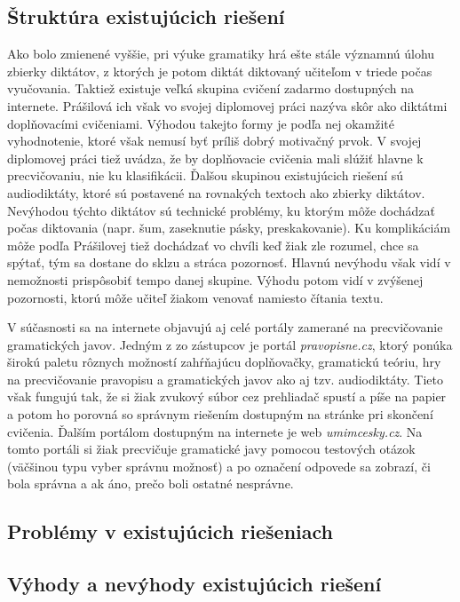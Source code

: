 \documentclass[12pt,oneside]{fithesis2}
\begin{document}
       		\subsection{Štruktúra existujúcich riešení}
       				\par Ako bolo zmienené vyššie, pri výuke gramatiky hrá ešte stále významnú úlohu zbierky diktátov, z ktorých je potom diktát diktovaný učiteľom v triede počas vyučovania. Taktiež existuje veľká skupina cvičení zadarmo dostupných na internete. Prášilová\cite{prasilova14} ich však vo svojej diplomovej práci nazýva skôr ako diktátmi doplňovacími cvičeniami. Výhodou takejto formy je podľa nej okamžité vyhodnotenie, ktoré však nemusí byť príliš dobrý motivačný prvok. V svojej diplomovej práci tiež uvádza, že by doplňovacie cvičenia mali slúžiť hlavne k precvičovaniu, nie ku klasifikácii. Ďalšou skupinou existujúcich riešení sú audiodiktáty, ktoré sú postavené na rovnakých textoch ako zbierky diktátov. Nevýhodou týchto diktátov sú technické problémy, ku ktorým môže dochádzať počas diktovania (napr. šum, zaseknutie pásky, preskakovanie). Ku komplikáciám môže podľa Prášilovej tiež dochádzať vo chvíli keď žiak zle rozumel, chce sa spýtať, tým sa dostane do sklzu a stráca pozornosť. Hlavnú nevýhodu však vidí v nemožnosti prispôsobiť tempo danej skupine. Výhodu potom vidí v zvýšenej pozornosti, ktorú môže učiteľ žiakom venovať namiesto čítania textu.
		\par V súčasnosti sa na internete objavujú aj celé portály zamerané na precvičovanie gramatických javov. Jedným z zo zástupcov je portál \textit{pravopisne.cz}, ktorý ponúka širokú paletu rôznych možností zahŕňajúcu doplňovačky, gramatickú teóriu, hry na precvičovanie pravopisu a gramatických javov ako aj tzv. audiodiktáty. Tieto však fungujú tak, že si žiak zvukový súbor cez prehliadač spustí a píše na papier a potom ho porovná so správnym riešením dostupným na stránke pri skončení cvičenia. Ďalším portálom dostupným na internete je web \textit{umimcesky.cz}. Na tomto portáli si žiak precvičuje gramatické javy pomocou testových otázok (väčšinou typu vyber správnu možnosť) a po označení odpovede sa zobrazí, či bola správna a ak áno, prečo boli ostatné nesprávne.
       		\subsection{Problémy v existujúcich riešeniach}
       		\subsection{Výhody a nevýhody existujúcich riešení}
\end{document}
